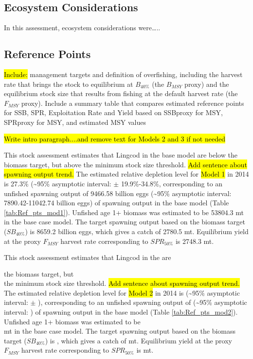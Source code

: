 \documentclass[12pt,]{article}
\begin{document}
\FloatBarrier

\subsection*{Ecosystem Considerations}\label{ecosystem-considerations}

In this assessment, ecosystem considerations were\ldots{}..

\subsection*{Reference Points}\label{reference-points}

\hl{Include:} management targets and definition of overfishing,
including the harvest rate that brings the stock to equilibrium at
\(B_{40\%}\) (the \(B_{MSY}\) proxy) and the equilibrium stock size that
results from fishing at the default harvest rate (the \(F_{MSY}\)
proxy). Include a summary table that compares estimated reference points
for SSB, SPR, Exploitation Rate and Yield based on SSBproxy for MSY,
SPRproxy for MSY, and estimated MSY values

\hl{Write intro paragraph....and remove text for Models 2 and 3 if not needed}

This stock assessment estimates that Lingcod in the base model are below
the biomass target, but above the minimum stock size threshold.
\hl{Add sentence about spawning output trend.} The estimated relative
depletion level for \hl{Model 1} in 2014 is 27.3\%
(\textasciitilde{}95\% asymptotic interval: \(\pm\) 19.9\%-34.8\%,
corresponding to an unfished spawning output of 9466.58 billion eggs
(\textasciitilde{}95\% asymptotic interval: 7890.42-11042.74 billion
eggs) of spawning output in the base model (Table
\ref{tab:Ref_pts_mod1}). Unfished age 1+ biomass was estimated to be
53804.3 mt in the base case model. The target spawning output based on
the biomass target (\(SB_{40\%}\)) is 8659.2 billion eggs, which gives a
catch of 2780.5 mt. Equilibrium yield at the proxy \(F_{MSY}\) harvest
rate corresponding to \(SPR_{50\%}\) is 2748.3 mt.

This stock assessment estimates that Lingcod in the are

the biomass target, but\\
the minimum stock size threshold.
\hl{Add sentence about spawning output trend.} The estimated relative
depletion level for \hl{Model 2} in 2014 is (\textasciitilde{}95\%
asymptotic interval: \(\pm\) ), corresponding to an unfished spawning
output of (\textasciitilde{}95\% asymptotic interval: ) of spawning
output in the base model (Table \ref{tab:Ref_pts_mod2}). Unfished age 1+
biomass was estimated to be\\
mt in the base case model. The target spawning output based on the
biomass target (\(SB_{40\%}\)) is , which gives a catch of mt.
Equilibrium yield at the proxy \(F_{MSY}\) harvest rate corresponding to
\(SPR_{50\%}\) is mt.
\end{document}
